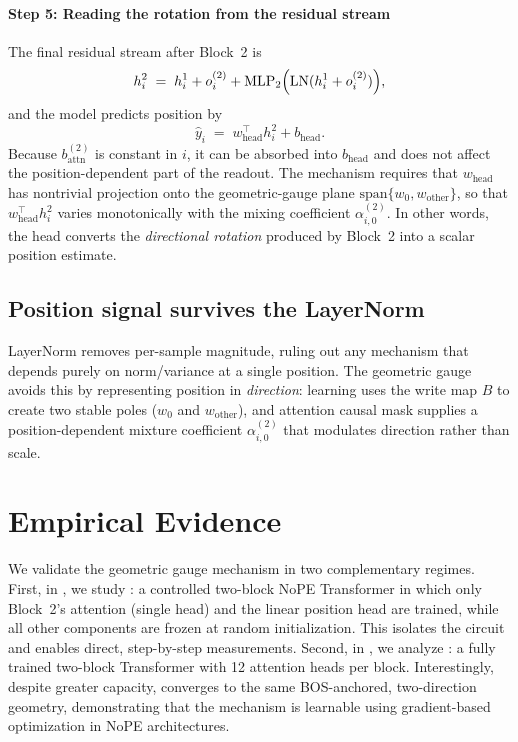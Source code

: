 \documentclass{article}
\theoremstyle{plain}
\theoremstyle{definition}
\theoremstyle{remark}
\begin{document}
\paragraph{Step 5: Reading the rotation from the residual stream}
\label{subsec:mech_step5}

The final residual stream after Block~2 is
\begin{equation}
h_i^2 \;=\; h_i^1 + o_i^{(2)} + \operatorname{MLP}_2\!\Big(\mathrm{LN}(h_i^1 + o_i^{(2)})\Big),
\end{equation}
and the model predicts position by
\begin{equation}
\hat y_i \;=\; w_{\text{head}}^\top h_i^2 + b_{\text{head}}.
\end{equation}
Because $b_{\text{attn}}^{(2)}$ is constant in $i$, it can be absorbed into $b_{\text{head}}$ and does not affect the
position-dependent part of the readout.
The mechanism requires that $w_{\text{head}}$ has nontrivial projection onto the geometric-gauge plane
$\mathrm{span}\{w_0,w_{\text{other}}\}$, so that $w_{\text{head}}^\top h_i^2$ varies monotonically with the mixing
coefficient $\alpha_{i,0}^{(2)}$.
In other words, the head converts the \emph{directional rotation} produced by Block~2 into a scalar position estimate.

\subsection{Position signal survives the LayerNorm}
\label{subsec:mech_implications}

LayerNorm removes per-sample magnitude, ruling out any mechanism that depends purely on norm/variance at a single position. The geometric gauge avoids this by representing position in \emph{direction}: learning uses the write map $B$ to create two
stable poles ($w_0$ and $w_{\text{other}}$), and attention causal mask supplies a position-dependent mixture coefficient
$\alpha_{i,0}^{(2)}$ that modulates direction rather than scale.

\section{Empirical Evidence}
\label{sec:empirical}

We validate the geometric gauge mechanism in two complementary regimes.
First, in , we study \modelminimal: a controlled two-block NoPE Transformer in which only Block~2's attention (single head) and the linear position head are trained, while all other components are frozen at random initialization.
This isolates the circuit and enables direct, step-by-step measurements.
Second, in , we analyze \modelfull: a fully trained two-block Transformer with 12 attention heads per block.
Interestingly, despite greater capacity, \modelfull converges to the same BOS-anchored, two-direction geometry, demonstrating that the mechanism is learnable using gradient-based optimization in NoPE architectures.
\end{document}
